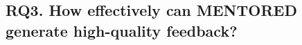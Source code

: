 \documentclass[10pt,conference]{IEEEtran}
\begin{document}
    \subsection{RQ3. How effectively can MENTORED generate high-quality feedback?}
\end{document}
